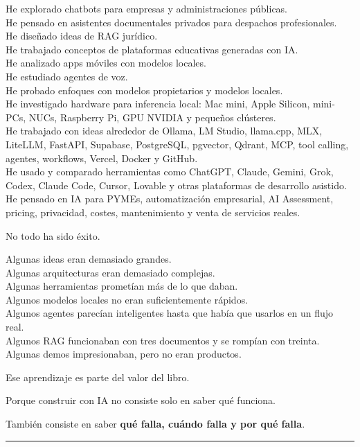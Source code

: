 He explorado chatbots para empresas y administraciones públicas.\\
He pensado en asistentes documentales privados para despachos
profesionales.\\
He diseñado ideas de RAG jurídico.\\
He trabajado conceptos de plataformas educativas generadas con IA.\\
He analizado apps móviles con modelos locales.\\
He estudiado agentes de voz.\\
He probado enfoques con modelos propietarios y modelos locales.\\
He investigado hardware para inferencia local: Mac mini, Apple Silicon,
mini-PCs, NUCs, Raspberry Pi, GPU NVIDIA y pequeños clústeres.\\
He trabajado con ideas alrededor de Ollama, LM Studio, llama.cpp, MLX,
LiteLLM, FastAPI, Supabase, PostgreSQL, pgvector, Qdrant, MCP, tool
calling, agentes, workflows, Vercel, Docker y GitHub.\\
He usado y comparado herramientas como ChatGPT, Claude, Gemini, Grok,
Codex, Claude Code, Cursor, Lovable y otras plataformas de desarrollo
asistido.\\
He pensado en IA para PYMEs, automatización empresarial, AI Assessment,
pricing, privacidad, costes, mantenimiento y venta de servicios reales.

No todo ha sido éxito.

Algunas ideas eran demasiado grandes.\\
Algunas arquitecturas eran demasiado complejas.\\
Algunas herramientas prometían más de lo que daban.\\
Algunos modelos locales no eran suficientemente rápidos.\\
Algunos agentes parecían inteligentes hasta que había que usarlos en un
flujo real.\\
Algunos RAG funcionaban con tres documentos y se rompían con treinta.\\
Algunas demos impresionaban, pero no eran productos.

Ese aprendizaje es parte del valor del libro.

Porque construir con IA no consiste solo en saber qué funciona.

También consiste en saber \textbf{qué falla, cuándo falla y por qué
falla}.

\begin{center}\rule{0.5\linewidth}{0.5pt}\end{center}

